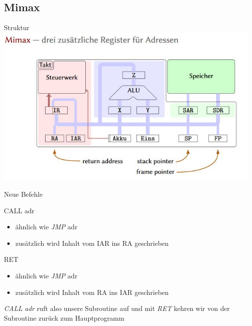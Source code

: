 \subsection{Mimax}

\begin{frame}{Struktur}
	\centering
	\includegraphics[width=\textwidth]{../topics/mimax/mimax_structure.jpg} 
\end{frame}

\begin{frame}{Neue Befehle}
	\begin{block}{CALL adr}
			\begin{itemize}
				\item ähnlich wie \emph{JMP} adr
				\item zusätzlich wird Inhalt vom IAR ins RA geschrieben
			\end{itemize}
		\end{block}
		
		\begin{block}{RET}
			\begin{itemize}
				\item ähnlich wie \emph{JMP} adr
				\item zusätzlich wird Inhalt vom RA ins IAR geschrieben
			\end{itemize}			
		\end{block}
	\emph{CALL adr} ruft also unsere Subroutine auf und mit \emph{RET} kehren wir von der Subroutine zurück zum Hauptprogramm
\end{frame}

